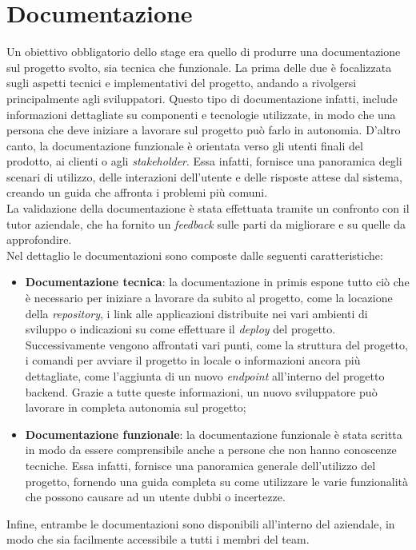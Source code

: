 \section{Documentazione}\label{sec:documentazione}
Un obiettivo obbligatorio dello stage era quello di produrre una documentazione sul progetto svolto, sia tecnica che funzionale.
La prima delle due è focalizzata sugli aspetti tecnici e implementativi del progetto, andando a rivolgersi principalmente agli sviluppatori.
Questo tipo di documentazione infatti, include informazioni dettagliate su componenti e tecnologie utilizzate, in modo che una persona che deve iniziare a lavorare sul progetto
può farlo in autonomia.
D'altro canto, la documentazione funzionale è orientata verso gli utenti finali del prodotto, ai clienti o agli \textit{stakeholder}.
Essa infatti, fornisce una panoramica degli scenari di utilizzo, delle interazioni dell'utente e delle risposte attese dal sistema, creando un guida che affronta i problemi più comuni.\\
La validazione della documentazione è stata effettuata tramite un confronto con il tutor aziendale, che ha fornito un \textit{feedback} sulle parti da migliorare e su quelle da approfondire.\\
Nel dettaglio le documentazioni sono composte dalle seguenti caratteristiche:
\begin{itemize}
  \item \textbf{Documentazione tecnica}: la documentazione in primis espone tutto ciò che è necessario per iniziare a lavorare da subito al progetto, come la locazione della \textit{repository}, i link 
  alle applicazioni distribuite nei vari ambienti di sviluppo o indicazioni su come effettuare il \textit{deploy} del progetto.\\
  Successivamente vengono affrontati vari punti, come la struttura del progetto, i comandi per avviare il progetto in locale o informazioni ancora più dettagliate, come l'aggiunta di un nuovo \textit{endpoint} all'interno del progetto backend.
  Grazie a tutte queste informazioni, un nuovo sviluppatore può lavorare in completa autonomia sul progetto;
  \item \textbf{Documentazione funzionale}: la documentazione funzionale è stata scritta in modo da essere comprensibile anche a persone che non hanno conoscenze tecniche.
  Essa infatti, fornisce una panoramica generale dell'utilizzo del progetto, fornendo una guida completa su come utilizzare le varie funzionalità che possono
  causare ad un utente dubbi o incertezze.
\end{itemize}
Infine, entrambe le documentazioni sono disponibili all'interno del  aziendale, in modo che sia facilmente accessibile a tutti i membri del team.


